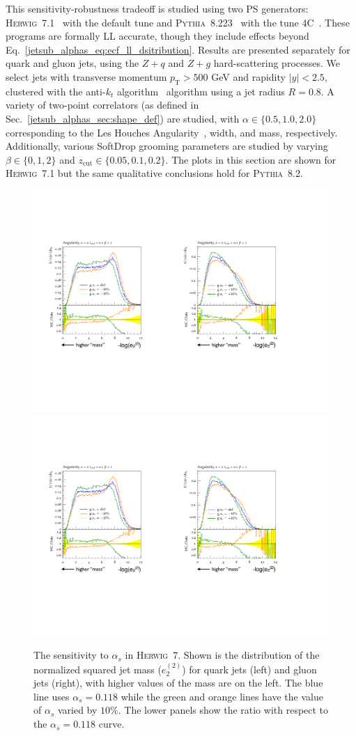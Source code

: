 \documentclass[11pt]{cernrep}
\begin{document}
This sensitivity-robustness tradeoff is studied using two PS generators: \textsc{Herwig~7}.1~\cite{Bellm:2015jjp,Reichelt:2017hts} with the default tune and \textsc{Pythia~8}.223~\cite{Sjostrand:2006za,Sjostrand:2014zea} with the tune 4C~\cite{Corke:2010yf}.  
%
These programs are formally LL accurate, though they include effects beyond Eq.~\eqref{jetsub_alphas_eq:ecf_ll_dsitribution}.
%
Results are presented separately for quark and gluon jets, using the $Z+q$ and $Z+g$ hard-scattering processes.
%
We select jets with transverse momentum $p_\mathrm{T}>500$ GeV and rapidity $|y|<2.5$, clustered with the anti-$k_t$ algorithm~\cite{Cacciari:2008gp} algorithm using a jet radius $R=0.8$.
%
A variety of two-point correlators (as defined in Sec.~\ref{jetsub_alphas_sec:shape_def}) are studied, with $\alpha\in\{0.5,1.0, 2.0\}$ corresponding to the Les Houches Angularity~\cite{Gras:2017jty}, width, and mass, respectively. 
%
Additionally, various SoftDrop grooming parameters are studied by varying $\beta\in\{0,1,2\}$ and $z_\mathrm{cut}\in \{0.05,0.1,0.2\}$.   The plots in this section are shown for \textsc{Herwig~7}.1 but the same qualitative conclusions hold for \textsc{Pythia~8}.2.

\begin{figure}[p]
\begin{center}
\includegraphics[width = 0.49\columnwidth]{jetsub_alphas_Sensitivity2a.pdf}
\includegraphics[width = 0.48\columnwidth]{jetsub_alphas_Sensitivity2b.pdf}
\end{center}
\caption{The sensitivity to $\alpha_s$ in \textsc{Herwig~7}.  Shown is the distribution of the normalized squared jet mass ($e_2^{(2)}$) for quark jets (left) and gluon jets (right), with higher values of the mass are on the left.  The blue line uses $\alpha_s=0.118$ while the green and orange lines have the value of $\alpha_s$ varied by $10\%$.  The lower panels show the ratio with respect to the $\alpha_s=0.118$ curve.}
\label{jetsub_alphas_fig:sensitivity}
\end{figure}
\end{document}
